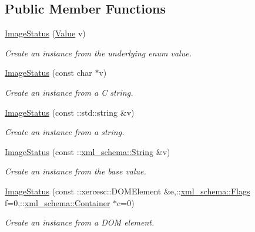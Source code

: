 \subsection*{Public Member Functions}
\begin{DoxyCompactItemize}
\item 
\hyperlink{classopenstack_1_1xml_1_1ImageStatus_aec99b54ab47c9d465fb86eb9f176464f}{ImageStatus} (\hyperlink{classopenstack_1_1xml_1_1ImageStatus_a188550ace9b21da799469c453a76c0d1}{Value} v)
\begin{DoxyCompactList}\small\item\em Create an instance from the underlying enum value. \item\end{DoxyCompactList}\item 
\hyperlink{classopenstack_1_1xml_1_1ImageStatus_a901ebebfe7eb1faf6e29af2f064685cf}{ImageStatus} (const char $\ast$v)
\begin{DoxyCompactList}\small\item\em Create an instance from a C string. \item\end{DoxyCompactList}\item 
\hyperlink{classopenstack_1_1xml_1_1ImageStatus_a093532ad5f18c337016f5d846e728884}{ImageStatus} (const ::std::string \&v)
\begin{DoxyCompactList}\small\item\em Create an instance from a string. \item\end{DoxyCompactList}\item 
\hyperlink{classopenstack_1_1xml_1_1ImageStatus_a37dbbb3742295c47d6136526cfad3e9f}{ImageStatus} (const ::\hyperlink{namespacexml__schema_af6757b5701ccc893f3b551bd70e0c94d}{xml\_\-schema::String} \&v)
\begin{DoxyCompactList}\small\item\em Create an instance from the base value. \item\end{DoxyCompactList}\item 
\hyperlink{classopenstack_1_1xml_1_1ImageStatus_a05955327f9b5fdd4b1486171f14909e2}{ImageStatus} (const ::xercesc::DOMElement \&e,::\hyperlink{namespacexml__schema_affb4c227cbd9aa7453dd1dc5a1401943}{xml\_\-schema::Flags} f=0,::\hyperlink{namespacexml__schema_a333dea2213742aea47a37532dec4ec27}{xml\_\-schema::Container} $\ast$c=0)
\begin{DoxyCompactList}\small\item\em Create an instance from a DOM element. \item\end{DoxyCompactList}\item 

\end{DoxyCompactItemize}
